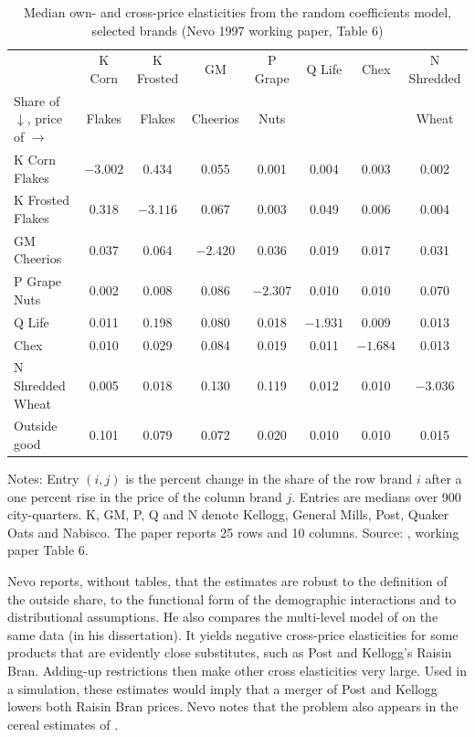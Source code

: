 \begin{table}[htbp]
\centering
\caption{Median own- and cross-price elasticities from the random coefficients model, selected brands (Nevo 1997
working paper, Table 6)}
\label{tab:11-nevo-elast}
\small
\setlength{\tabcolsep}{4.2pt}
\begin{tabular}{@{}lccccccc@{}}
\toprule
 & K Corn & K Frosted & GM & P Grape & Q Life & Chex & N Shredded \\
Share of $\downarrow$, price of $\rightarrow$ & Flakes & Flakes & Cheerios & Nuts & & & Wheat \\
\midrule
K Corn Flakes      & $-3.002$ & 0.434    & 0.055    & 0.001    & 0.004    & 0.003    & 0.002    \\
K Frosted Flakes   & 0.318    & $-3.116$ & 0.067    & 0.003    & 0.049    & 0.006    & 0.004    \\
GM Cheerios        & 0.037    & 0.064    & $-2.420$ & 0.036    & 0.019    & 0.017    & 0.031    \\
P Grape Nuts       & 0.002    & 0.008    & 0.086    & $-2.307$ & 0.010    & 0.010    & 0.070    \\
Q Life             & 0.011    & 0.198    & 0.080    & 0.018    & $-1.931$ & 0.009    & 0.013    \\
Chex               & 0.010    & 0.029    & 0.084    & 0.019    & 0.011    & $-1.684$ & 0.013    \\
N Shredded Wheat   & 0.005    & 0.018    & 0.130    & 0.119    & 0.012    & 0.010    & $-3.036$ \\
Outside good       & 0.101    & 0.079    & 0.072    & 0.020    & 0.010    & 0.010    & 0.015    \\
\bottomrule
\end{tabular}

\smallskip
\begin{minipage}{0.95\linewidth}
\footnotesize
Notes: Entry $(i,j)$ is the percent change in the share of the row brand $i$ after a one percent rise in the price of
the column brand $j$. Entries are medians over 900 city-quarters. K, GM, P, Q and N denote Kellogg, General Mills, Post, Quaker
Oats and Nabisco. The paper reports 25 rows and 10 columns. Source: \citet{Nevo2000b}, working paper Table 6.
\end{minipage}
\end{table}

 Nevo reports, without tables, that the estimates are robust to the definition of the outside
share, to the functional form of the demographic interactions and to distributional assumptions. He also compares the
multi-level model of \citet{HausmanLeonardZona1994} on the same data (in his dissertation). It yields negative
cross-price elasticities for some products that are evidently close substitutes, such as Post and Kellogg's Raisin Bran.
Adding-up restrictions then make other cross elasticities very large. Used in a simulation, these estimates would imply
that a merger of Post and Kellogg lowers both Raisin Bran prices. Nevo notes that the problem also appears in
the cereal estimates of \citet{Hausman1997}.

